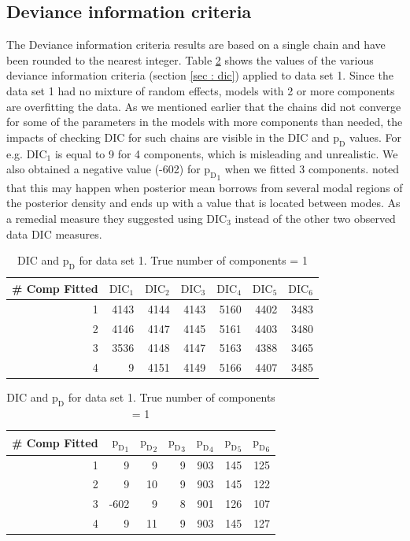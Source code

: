 \subsection{Deviance information criteria}
\label{subsec : dic_simulation_results}
The Deviance information criteria results are based on a single chain and have been rounded to the nearest integer. Table \ref{table : ds_simple_dic} shows the values of the various deviance information criteria (section \ref{sec : dic}) applied to data set 1. Since the data set 1 had no mixture of random effects, models with 2 or more components are overfitting the data. As we mentioned earlier that the chains did not converge for some of the parameters in the models with more components than needed, the impacts of checking DIC for such chains are visible in the DIC and ${\text{p}_\text{D}}$ values. For e.g. $\text{DIC}_1$ is equal to 9 for 4 components, which is misleading and unrealistic. We also obtained a negative value (-602) for ${\text{p}_\text{D}}_1$ when we fitted 3 components. \citet{celeux_deviance_2006} noted that this may happen when posterior mean borrows from several modal regions of the posterior density and ends up with a value that is located between modes. As a remedial measure they suggested using $\text{DIC}_3$ instead of the other two observed data DIC measures.\\

\begin{table}[!htb]
\centering
\captionsetup{justification=centering}
\caption{DIC and $\text{p}_\text{D}$ for data set 1. True number of components = 1}
\label{table : ds_simple_dic} 
\begin{tabular}{@{}rrrrrrr@{}}
\toprule
\# Comp Fitted & $\text{DIC}_1$ & $\text{DIC}_2$  & $\text{DIC}_3$  & $\text{DIC}_4$  & $\text{DIC}_5$  & $\text{DIC}_6$  \\ \midrule
1      & 4143 & 4144 & 4143 & 5160 & 4402 & 3483 \\
2      & 4146 & 4147 & 4145 & 5161 & 4403 & 3480 \\
3      & 3536 & 4148 & 4147 & 5163 & 4388 & 3465 \\
4      & 9    & 4151 & 4149 & 5166 & 4407 & 3485 \\ \bottomrule
\end{tabular}

\begin{tabular}{@{}rrrrrrr@{}}
\toprule
\# Comp Fitted & ${\text{p}_\text{D}}_1$ & ${\text{p}_\text{D}}_2$ & ${\text{p}_\text{D}}_3$ & ${\text{p}_\text{D}}_4$ & ${\text{p}_\text{D}}_5$ & ${\text{p}_\text{D}}_6$ \\ \midrule
1      & 9    & 9    & 9    & 903  & 145  & 125  \\
2      & 9    & 10   & 9    & 903  & 145  & 122  \\
3      & -602 & 9    & 8    & 901  & 126  & 107  \\
4      & 9    & 11   & 9    & 903  & 145  & 127  \\ \bottomrule
\end{tabular}
\end{table}

